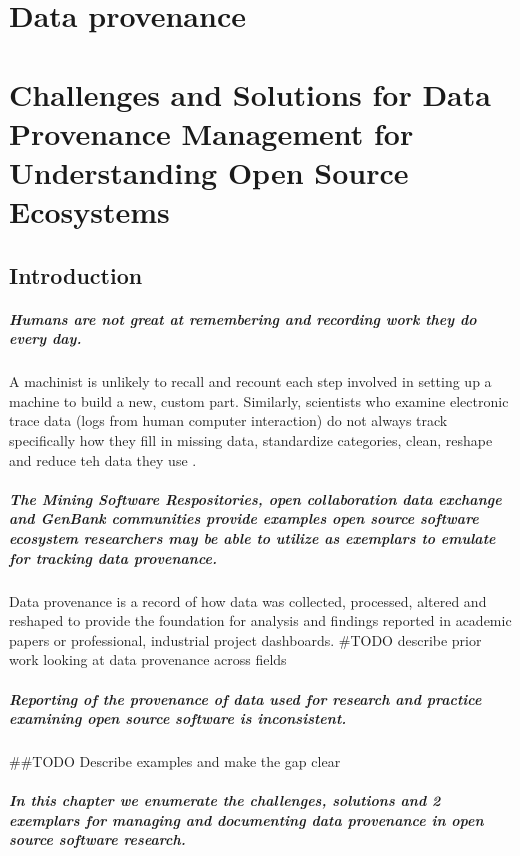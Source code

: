 \chapter{Data provenance}
\chapter*{Challenges and Solutions for Data Provenance Management for Understanding Open Source Ecosystems}
\section{Introduction}
\paragraph{Humans are not great at remembering and recording work they do every day.} A machinist is unlikely to recall and recount each step involved in setting up a machine to build a new, custom part. Similarly, scientists who examine electronic trace data (logs from human computer interaction) do not always track specifically how they fill in missing data, standardize categories, clean, reshape and reduce teh data they use \cite{Goggins et al 2016}. 
\paragraph{The Mining Software Respositories, open collaboration data exchange and GenBank communities provide examples open source software ecosystem researchers may be able to utilize as exemplars to emulate for tracking data provenance.}  Data provenance is a record of how data was collected, processed, altered and reshaped to provide the foundation for analysis and findings reported in academic papers or professional, industrial project dashboards. #TODO describe prior work looking at data provenance across fields
\paragraph{Reporting of the provenance of data used for research and practice examining open source software is inconsistent.} ##TODO Describe examples and make the gap clear
\paragraph{In this chapter we enumerate the challenges, solutions and 2 exemplars for managing and documenting data provenance in open source software research.}
